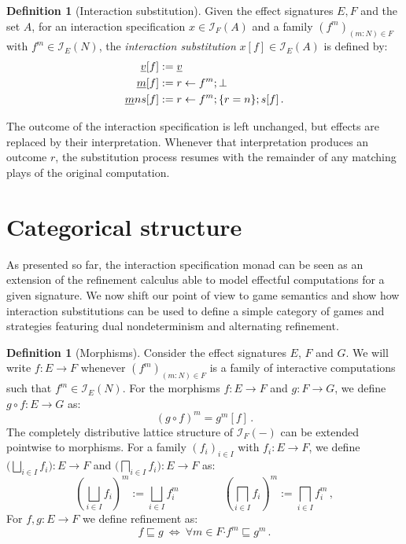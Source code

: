 \documentclass[11pt,oneside,draft]{book}
\theoremstyle{definition}
\newtheorem{definition}[theorem]{Definition}
\newcommand{\bdot}{\boldsymbol{\cdot}}
\newcommand{\ul}[1]{%
  \underline{\smash{#1}}
}
\begin{document}
\begin{definition}[Interaction substitution]
Given the effect signatures $E, F$ and the set $A$,
for an interaction specification $x \in \mathcal{I}_F(A)$
and a family $(f^m)_{(m \mathbin: N) \in F}$
with $f^m \in \mathcal{I}_E(N)$,
the \emph{interaction substitution} $x[f] \in \mathcal{I}_E(A)$
is defined by:
\begin{align*}
  \ul{v}[f] &:= \ul{v} \\
  \ul{m}[f] &:= r \leftarrow f^m ; \bot \\
  \ul{m}ns[f] &:= r \leftarrow f^m ; \{r = n\} ; s[f] \,.
\end{align*}
\end{definition}


The outcome of the interaction specification is left unchanged,
but effects are replaced by their interpretation.
Whenever that interpretation produces an outcome $r$,
the substitution process resumes with the remainder of any
matching plays of the original computation.


\section{Categorical structure} \label{sec:intm:cat} %

As presented so far,
the interaction specification monad
can be seen as an extension of the refinement calculus
able to model effectful computations
for a given signature.
We now shift our point of view to game semantics
and show how interaction substitutions
can be used to define a simple category of games and strategies
featuring dual nondeterminism and alternating refinement.

\begin{definition}[Morphisms]
Consider the effect signatures $E$, $F$ and $G$.
We will write $f : E \rightarrow F$
whenever $(f^m)_{(m \mathbin: N) \in F}$ is a family of interactive computations
such that $f^m \in \mathcal{I}_E(N)$.
For the morphisms $f : E \rightarrow F$ and $g : F \rightarrow G$,
we define $g \circ f : E \rightarrow G$ as:
\[ (g \circ f)^m = g^m[f] \,. \]
The completely distributive lattice structure
of $\mathcal{I}_F(-)$ can be extended pointwise
to morphisms.
For a family $(f_i)_{i \in I}$
with $f_i : E \rightarrow F$,
we define
$\big( \bigsqcup_{i \in I} f_i \big) : E \rightarrow F$ and
$\big( \bigsqcap_{i \in I} f_i \big) : E \rightarrow F$
as:
\[
  \left( \bigsqcup_{i \in I} f_i \right)^m :=
    \bigsqcup_{i \in I} f_i^m
  \qquad
  \qquad
  \left( \bigsqcap_{i \in I} f_i \right)^m :=
    \bigsqcap_{i \in I} f_i^m \,,
\]
For $f, g : E \rightarrow F$
we define refinement as:
\[
    f \sqsubseteq g \: \Leftrightarrow \:
    \forall m \in F \bdot f^m \sqsubseteq g^m \,.
\]
\end{definition}
\end{document}
